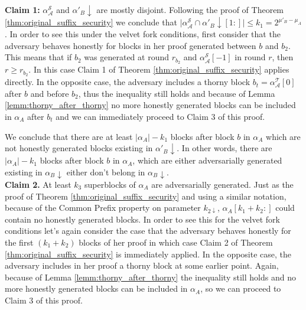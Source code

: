 \textbf{Claim 1:} $\alpha^{\mathcal{S}}_\mathcal{A}$ and
$\alpha'_B\downarrow$ are mostly disjoint. Following the proof of Theorem 
\ref{thm:original_suffix_security} we conclude that 
$\vert \alpha^{\mathcal{S}}_\mathcal{A} \cap \alpha'_B\downarrow[1:] \vert \leq k_{1} = 2^{\mu'_B - \mu_A}$. 
In order to see this under the velvet fork conditions, first consider that the adversary behaves honestly for blocks in her proof generated between $b$ and $b_2$. This means that if $b_2$ was generated at round $r_{b_2}$ and $\alpha^{\mathcal{S}}_\mathcal{A}[-1]$ in round $r$, then $r \geq r_{b_2}$. In this case Claim 1 of
Theorem \ref{thm:original_suffix_security} applies directly. In the opposite case, the adversary includes a thorny block $b_t = \alpha^{\mathcal{T}}_{\mathcal{A}}[0]$ after $b$ and before $b_2$, thus the inequality still
holds and because of Lemma \ref{lemm:thorny_after_thorny} no more honestly generated blocks can be included
in $\alpha_A$ after $b_t$ and we can immediately proceed to Claim 3 of this proof.

We conclude that there are at least $\vert \alpha_A \vert - k_1$ blocks after
block $b$ in $\alpha_A$ which are not honestly generated blocks existing in
$\alpha'_B\downarrow$. In other words, there are $\vert \alpha_A \vert - k_1$
blocks after block $b$ in $\alpha_A$, which are either adversarially generated
existing in $\alpha_B\downarrow$ either don't belong in $\alpha_B\downarrow$.\\

\textbf{Claim 2.} 
At least $k_3$ superblocks of $\alpha_A$ are adversarially generated. Just as
the proof of Theorem \ref{thm:original_suffix_security} and using a similar notation, because of the Common Prefix
property on parameter $k_{2\downarrow}$, $\alpha_A[k_{1}+k_{2}:]$ could contain
no honestly generated blocks. In order to see this for the velvet fork conditions
let's again consider the case that the adversary behaves honestly for the first
$(k_1 + k_2)$ blocks of her proof in which case Claim 2 of Theorem 
\ref{thm:original_suffix_security} is immediately applied. In the opposite case,
the adversary includes in her proof a
thorny block at some earlier point. Again, because of Lemma 
\ref{lemm:thorny_after_thorny} the inequality still holds and no more
honestly generated blocks can be included in $\alpha_A$, so we can proceed to Claim 3
of this proof.\\


